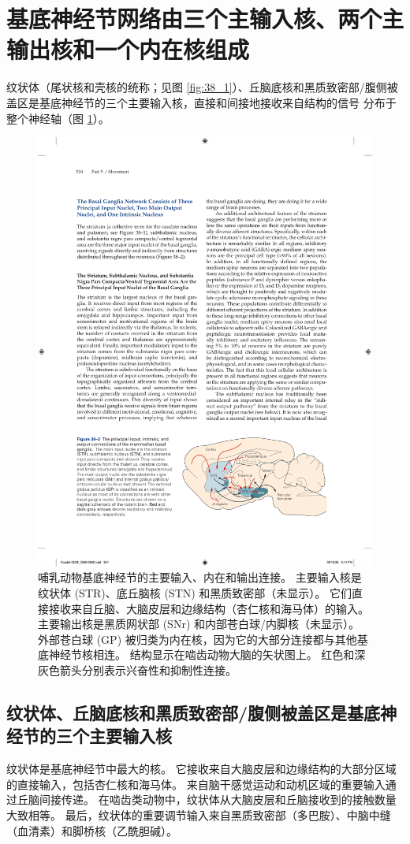 \section{基底神经节网络由三个主输入核、两个主输出核和一个内在核组成}
纹状体（尾状核和壳核的统称；见图 \ref{fig:38_1}）、丘脑底核和黑质致密部/腹侧被盖区是基底神经节的三个主要输入核，直接和间接地接收来自结构的信号 分布于整个神经轴（图 \ref{fig:38_2}）。

\begin{figure}[htbp]
	\centering
	\includegraphics[width=0.6\linewidth]{chap38/fig_38_2}
	\caption{哺乳动物基底神经节的主要输入、内在和输出连接。 主要输入核是纹状体 (STR)、底丘脑核 (STN) 和黑质致密部（未显示）。 它们直接接收来自丘脑、大脑皮层和边缘结构（杏仁核和海马体）的输入。 主要输出核是黑质网状部 (SNr) 和内部苍白球/内脚核（未显示）。 外部苍白球 (GP) 被归类为内在核，因为它的大部分连接都与其他基底神经节核相连。 结构显示在啮齿动物大脑的矢状图上。 红色和深灰色箭头分别表示兴奋性和抑制性连接。}
	\label{fig:38_2}
\end{figure}

\subsection{纹状体、丘脑底核和黑质致密部/腹侧被盖区是基底神经节的三个主要输入核}
纹状体是基底神经节中最大的核。 它接收来自大脑皮层和边缘结构的大部分区域的直接输入，包括杏仁核和海马体。 来自脑干感觉运动和动机区域的重要输入通过丘脑间接传递。 在啮齿类动物中，纹状体从大脑皮层和丘脑接收到的接触数量大致相等。 最后，纹状体的重要调节输入来自黑质致密部（多巴胺）、中脑中缝（血清素）和脚桥核（乙酰胆碱）。

